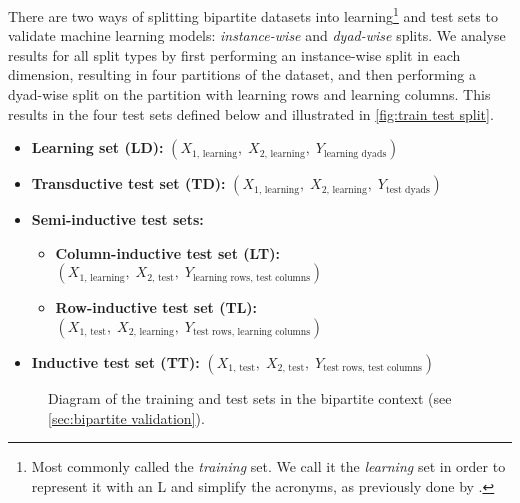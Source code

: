 \documentclass[sn-mathphys-num]{sn-jnl}%
\theoremstyle{thmstyleone}%
\theoremstyle{thmstyletwo}%
\theoremstyle{thmstylethree}%
\begin{document}
There are two ways of splitting bipartite datasets into learning\footnote{Most commonly called the \emph{training} set. We call it the \emph{learning} set in order to represent it with an L and simplify the acronyms, as previously done by \cite{schrynemackers_protocols_2013,pliakos_global_2018}.} and test sets to validate machine learning models: \emph{instance-wise} and \emph{dyad-wise} splits.
We analyse results for all split types by first performing an instance-wise split in each dimension, resulting in four partitions of the dataset, and then performing a dyad-wise split on the partition with learning rows and learning columns.
This results in the four test sets defined below and illustrated in \autoref{fig:train test split}.
%
\begin{itemize}
    \item \textbf{Learning set (LD):}
    $(X_\text{1, learning},\;X_\text{2, learning}, \;Y_\text{learning dyads})$
    \item \textbf{Transductive test set (TD):}
    $(X_\text{1, learning},\;X_\text{2, learning}, \;Y_\text{test dyads})$
    \item \textbf{Semi-inductive test sets:}
    \begin{itemize}
        \item \textbf{Column-inductive test set (LT):}
            $
                (X_\text{1, learning},
                \;X_\text{2, test},
                \;Y_\text{learning rows, test columns})
            $
        \item \textbf{Row-inductive test set (TL):}
            $
                (X_\text{1, test},
                \;X_\text{2, learning},
                \;Y_\text{test rows, learning columns})
            $
    \end{itemize}
    \item \textbf{Inductive test set (TT):}
    $(
        X_\text{1, test},
        \;X_\text{2, test},
        \;Y_\text{test rows, test columns}
    )$
\end{itemize}

\begin{figure}[bth]
    \centering
    \def\svgscale{.3}
    
    \caption{Diagram of the training and test sets in the bipartite context (see \autoref{sec:bipartite validation}).}
    \label{fig:train test split}
\end{figure}
 
\end{document}
